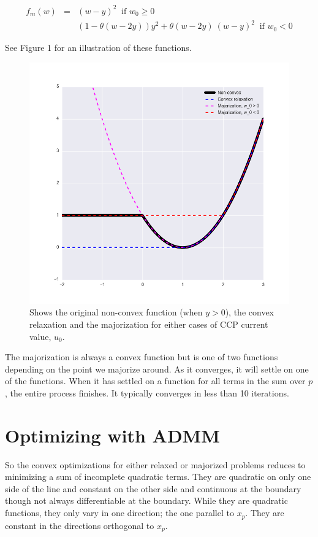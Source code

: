 \documentclass{article}
\begin{document}
\begin{eqnarray}
f_m(w) & = & (w - y)^2  ~ \mbox{~if~} w_0 \ge 0 \\
 & & (1-\theta(w-2y)) y^2 + \theta(w-2y)~(w - y)^2 ~ \mbox{~if~} w_0 < 0
\end{eqnarray}

See Figure 1 for an illustration of these functions.

\begin{figure}
  \includegraphics[width=\textwidth]{relax_maj.png}
  \caption{Shows the original non-convex function (when $y>0$),
  the convex relaxation and the
  majorization for either cases of CCP current value, $u_0$.}
\end{figure}


The majorization is always a convex function but is one of two functions
depending on the point we majorize around. As it converges, it will settle on
one of the functions. When it has settled on a function for all terms in the
sum over $p$, the entire process finishes. It typically converges in less than
10 iterations.

\section{Optimizing with ADMM}

So the convex optimizations for either relaxed or majorized problems reduces to
minimizing a sum of incomplete quadratic terms. They are
quadratic on only one side of the line and constant on the other side and
continuous at the boundary though not always differentiable at the boundary.
While they are quadratic functions, they only vary in one direction; the one
parallel to $x_p$. They are constant in the directions orthogonal to $x_p$.
\end{document}
